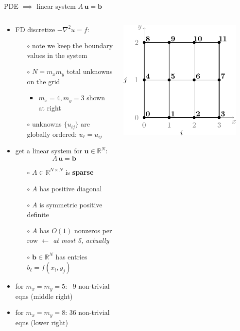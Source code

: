 \documentclass[10pt,
               svgnames,
               hyperref={colorlinks,citecolor=DeepPink4,linkcolor=FireBrick,urlcolor=Maroon},
               usepdftitle=false]{beamer}
\newcommand{\bb}{\mathbf{b}}
\newcommand{\bu}{\mathbf{u}}
\newcommand{\RR}{\mathbb{R}}
\newcommand{\grad}{\nabla}
\begin{document}
\begin{frame}{PDE $\implies$ linear system $A\,\bu=\bb$}
\begin{columns}
\begin{column}{0.73\textwidth}
\begin{itemize}
\item FD discretize $-\grad^2 u = f$:
	\begin{itemize}
	\item[$\circ$] note we keep the boundary values in the system
	\item[$\circ$] $N=m_x m_y$ total unknowns on the grid
	    \begin{itemize}
	    \item $m_x=4,m_y=3$ shown at right
        \end{itemize}
	\item[$\circ$] unknowns $\{u_{ij}\}$ are globally ordered: $u_\ell = u_{ij}$
	\end{itemize}
\item get a linear system for $\bu \in \RR^N$:
	$$A\, \bu = \bb$$

	\begin{itemize}
	\item[$\circ$] $A \in \RR^{N\times N}$ is \textbf{sparse}
	\item[$\circ$] $A$ has positive diagonal
	\item[$\circ$] $A$ is symmetric positive definite
	\item[$\circ$] $A$ has $O(1)$ nonzeros per row \hfill {\footnotesize \emph{$\leftarrow$ at most 5, actually}}
	\item[$\circ$] $\bb \in \RR^N$ has entries $b_\ell = f(x_i,y_j)$
	\end{itemize}
\item for $m_x=m_y=5$: \,\,\,9 non-trivial eqns (middle right)
\item for $m_x=m_y=8$: 36 non-trivial eqns (lower right)
\end{itemize}
\end{column}
\begin{column}{0.27\textwidth}
\hfill \includegraphics[width=0.9\textwidth]{images/gridordering.png}


\end{column}
\end{columns}
\end{frame}
\end{document}
